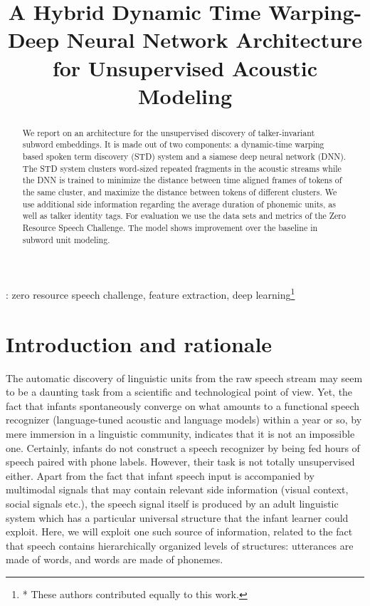 \documentclass[a4paper]{article}
\title{A Hybrid Dynamic Time Warping-Deep Neural Network Architecture for Unsupervised Acoustic Modeling}
\begin{document}
\maketitle

\begin{abstract}
We report on an architecture for the unsupervised discovery of talker-invariant subword embeddings. It is made out of two components: a dynamic-time warping based spoken term discovery (STD) system and a siamese deep neural network (DNN). The STD system clusters word-sized repeated fragments in the acoustic streams while the DNN is trained to minimize the distance between time aligned frames of tokens of the same cluster, and maximize the distance between tokens of different clusters. We use additional side information regarding the average duration of phonemic units, as well as talker identity tags. For evaluation we use the data sets and metrics of the Zero Resource Speech Challenge. The model shows improvement over the baseline in subword unit modeling. 
\end{abstract}
: zero resource speech challenge, feature extraction, deep learning\let\thefootnote\relax\footnote{* These authors contributed equally to this work.}


\section{Introduction and rationale}

The automatic discovery of linguistic units from the raw speech stream \cite{XXX} may seem to be a daunting task from a scientific and technological point of view. Yet, the fact that infants spontaneously converge on what amounts to a functional speech recognizer (language-tuned acoustic and language models) within a year or so, by mere immersion in a linguistic community, indicates that it is not an impossible one. Certainly, infants do not construct a speech recognizer by being fed hours of speech paired with phone labels. However, their task is not totally unsupervised either. Apart from the fact that infant speech input is accompanied by multimodal signals that may contain relevant side information (visual context, social signals etc.), the speech signal itself is produced by an adult linguistic system which has a particular universal structure that the infant learner could exploit. Here, we will exploit one such source of information, related to the fact that speech contains hierarchically organized levels of structures: utterances are made of words, and words are made of phonemes. 
\end{document}
